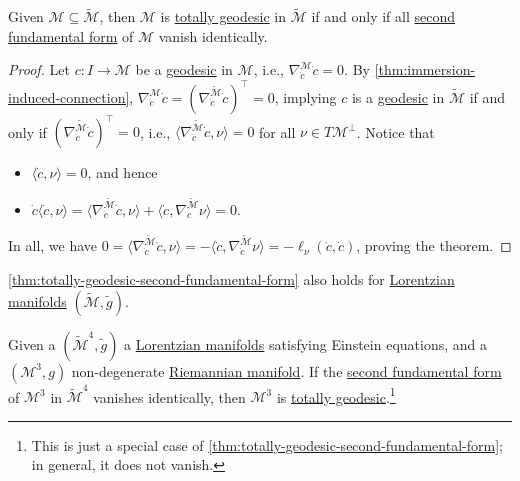 \begin{theorem}\label{thm:totally-geodesic-second-fundamental-form}
	Given \(\mathcal{M} \subseteq \widetilde{\mathcal{M}} \), then \(\mathcal{M} \) is \hyperref[def:totally-geodesic]{totally geodesic} in \(\widetilde{\mathcal{M}} \) if and only if all \hyperref[def:2nd-fundamental-form]{second fundamental form} of \(\mathcal{M} \) vanish identically.
\end{theorem}
\begin{proof}
	Let \(c\colon I \to \mathcal{M} \) be a \hyperref[def:geodesic]{geodesic} in \(\mathcal{M} \), i.e., \(\nabla _{\dot{c} }^{\mathcal{M}} \dot{c} = 0\). By \autoref{thm:immersion-induced-connection}, \(\nabla _{\dot{c} }^{\mathcal{M}} \dot{c} = (\nabla _{\dot{c} }^{\widetilde{\mathcal{M}} } \dot{c} )^{\top} = 0\), implying \(c\) is a \hyperref[def:geodesic]{geodesic} in \(\widetilde{\mathcal{M}} \) if and only if \((\nabla _{\dot{c} }^{\widetilde{\mathcal{M}} } \dot{c} )^{\top} = 0\), i.e., \(\langle \nabla _{\dot{c} }^{\widetilde{\mathcal{M}} } \dot{c} , \nu \rangle = 0\) for all \(\nu \in T \mathcal{M} ^{\perp} \). Notice that
	\begin{itemize}
		\item \(\langle \dot{c} , \nu \rangle = 0\), and hence
		\item \(\dot{c} \langle \dot{c} , \nu \rangle = \langle \nabla _{\dot{c} }^{\widetilde{\mathcal{M}} } \dot{c} , \nu \rangle + \langle \dot{c} , \nabla _{\dot{c} }^{\widetilde{\mathcal{M}} } \nu \rangle = 0\).
	\end{itemize}
	In all, we have \(0 = \langle \nabla _{\dot{c}}^{\widetilde{\mathcal{M}} } \dot{c} , \nu \rangle = -\langle \dot{c} , \nabla _{\dot{c} }^{\widetilde{\mathcal{M}} } \nu \rangle = -\ell _{\nu } (\dot{c}, \dot{c} )\), proving the theorem.
\end{proof}

\begin{note}
	\autoref{thm:totally-geodesic-second-fundamental-form} also holds for \hyperref[def:Lorentzian]{Lorentzian manifolds} \((\widetilde{\mathcal{M}} , \widetilde{g} )\).
\end{note}

\begin{eg}
	Given a \((\widetilde{\mathcal{M}} ^4, \widetilde{g} )\) a \hyperref[def:Lorentzian]{Lorentzian manifolds} satisfying Einstein equations, and a \((\mathcal{M} ^3, g)\) non-degenerate \hyperref[def:Riemannian-manifold]{Riemannian manifold}. If the \hyperref[def:2nd-fundamental-form]{second fundamental form} of \(\mathcal{M} ^3\) in \(\widetilde{\mathcal{M}} ^4\) vanishes identically, then \(\mathcal{M} ^3\) is \hyperref[def:totally-geodesic]{totally geodesic}.\footnote{This is just a special case of \autoref{thm:totally-geodesic-second-fundamental-form}; in general, it does not vanish.}
\end{eg}

